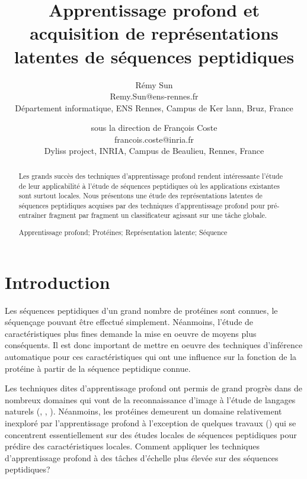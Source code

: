 \documentclass[a4paper, 11pt, onecolumn]{article}
\title{Apprentissage profond et acquisition de représentations latentes de séquences peptidiques}
\author{Rémy Sun \\
  Remy.Sun@ens-rennes.fr \\
  Département informatique, ENS Rennes, Campus de Ker lann, Bruz, France
\and
  sous la direction de Fran\c{c}ois Coste \\
  francois.coste@inria.fr\\
   Dyliss project, INRIA, Campus de Beaulieu, Rennes, France
 }
\newenvironment{keywords}%
{\description\item[Mots-clés.]}%
{\enddescription}
\begin{document}
\begin{titlingpage}
  \maketitle

\begin{abstract}
  Les grands succès des techniques d'apprentissage profond rendent intéressante
  l'étude de leur applicabilité à l'étude de séquences peptidiques où les
  applications existantes sont surtout locales. Nous présentons une étude des
  représentations latentes de séquences peptidiques acquises par des techniques
  d'apprentissage profond pour pré-entraîner fragment par fragment un
  classificateur agissant sur une tâche globale.
  \begin{keywords}
    Apprentissage profond; Protéines; Représentation latente; Séquence
  \end{keywords}
\end{abstract}

\newpage

\tableofcontents

\end{titlingpage}


\section*{Introduction}


Les séquences peptidiques d'un grand nombre de protéines sont connues, le
séquençage pouvant être effectué simplement. Néanmoins, l'étude de caractéristiques plus
fines demande la mise en oeuvre de moyens plus conséquents. Il est donc important de mettre en oeuvre des techniques
d'inférence automatique pour ces caractéristiques qui ont une influence sur la
fonction de la protéine à partir de la séquence peptidique connue.

Les techniques dites d'apprentissage profond ont permis de grand progrès dans de
nombreux domaines qui vont de la reconnaissance d'image à l'étude de langages
naturels (\cite{DBLP:journals/corr/ChoMGBSB14}, \cite{socher2011semi}, \cite{NIPS2014_5346}). Néanmoins, les
protéines demeurent un domaine relativement inexploré par l'apprentissage
profond à l'exception de quelques travaux
(\cite{Spencer:2015:DLN:2817095.2817106}) qui se concentrent essentiellement sur
des études locales de séquences peptidiques pour prédire des caractéristiques
locales. Comment appliquer les techniques d'apprentissage profond à des
tâches d'échelle plus élevée  sur des séquences peptidiques?
\end{document}
